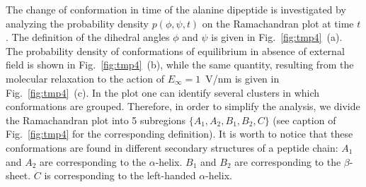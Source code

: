 \documentclass[a4paper,preprint,unsortedaddress,onecolumn]{revtex4-1}
\begin{document}
The change of conformation in time of the alanine dipeptide is
investigated by analyzing the probability density $p(\phi,\psi,t)$ on
the Ramachandran plot at time $t$. The definition of the dihedral
angles $\phi$ and $\psi$ is given in Fig.~\ref{fig:tmp4}~(a).
The probability density of conformations of equilibrium in absence of external field is shown in Fig.~\ref{fig:tmp4}~(b), while the same quantity, resulting from the molecular relaxation to the action of $E_{\infty} = 1$~V/nm is
given in Fig.~\ref{fig:tmp4}~(c). In the plot one can identify several clusters
in which conformations are grouped.
Therefore, in order to simplify the analysis, we divide the
Ramachandran plot into 5 subregions $\{A_1, A_2, B_1, B_2, C\}$
(see caption of Fig.~\ref{fig:tmp4} for the corresponding definition).
It is worth to notice that these conformations
are found in different secondary structures of a peptide chain:
$A_1$ and $A_2$ are
corresponding to the $\alpha$-helix. $B_1$ and $B_2$ are
corresponding to the $\beta$-sheet. $C$ is corresponding to the
left-handed $\alpha$-helix.
\end{document}
